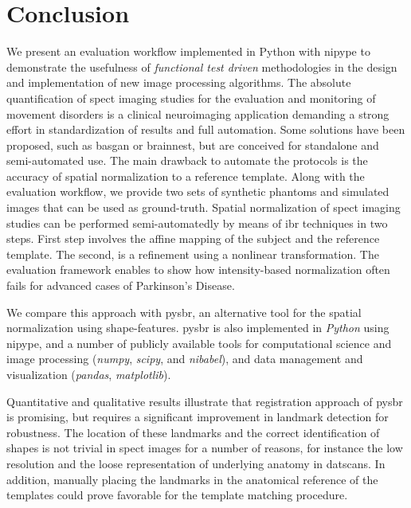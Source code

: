 \documentclass{frontiers}
\newcommand{\cbstart}{\relax}
\newcommand{\cbend}{\relax}
\begin{document}
\section{Conclusion}
\label{sec:conclusion}
\cbstart
We present an evaluation workflow implemented in Python
  with \gls*{nipype} to demonstrate the usefulness of
  \emph{functional test driven} methodologies in the design
  and implementation of new image processing algorithms.
The absolute quantification of \gls*{spect} imaging studies
  for the evaluation and monitoring of movement disorders is
  a clinical neuroimaging application demanding a strong effort
  in standardization of results and full automation.
Some solutions have been proposed, such as \gls*{basgan} or
  \gls*{brainnest}, but are conceived for standalone and
  semi-automated use.
The main drawback to automate the protocols is the accuracy of
  spatial normalization to a reference template.
Along with the evaluation workflow, we provide two sets of
  synthetic phantoms and simulated images that can be used
  as ground-truth.
Spatial normalization of \gls*{spect} imaging studies can be
  performed semi-automatedly by means of \gls*{ibr} techniques in 
  two steps.
\cbend
First step involves the affine mapping of the subject and the
  reference template.
The second, is a refinement using a nonlinear transformation.
The evaluation framework enables to show 
  how intensity-based normalization often fails
  for advanced cases of Parkinson's Disease.

We compare this approach with \gls*{pysbr}, an alternative tool for the
  spatial normalization using shape-features.
\Gls*{pysbr} is also implemented in \emph{Python} using
  \gls*{nipype}, and a number of publicly available tools
  for computational science and image processing
  (\emph{numpy}, \emph{scipy}, and \emph{nibabel}),
  and data management and visualization (\emph{pandas},
  \emph{matplotlib}).
  
Quantitative and qualitative results illustrate that registration approach
  of \gls*{pysbr} is promising, but requires a significant improvement
  in landmark detection for robustness.
The location of these landmarks and the correct identification of
  shapes is not trivial in \gls*{spect} images for a number of reasons,
  for instance the low resolution and the loose representation of
  underlying anatomy in \glspl*{datscan}.
In addition, manually placing the landmarks in the anatomical reference of the 
  templates could prove favorable for the template matching procedure.
 
\end{document}
